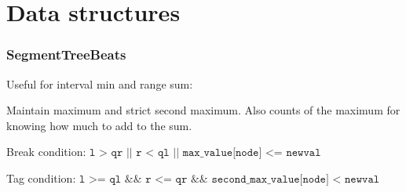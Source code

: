 \chapter{Data structures}

\subsection{SegmentTreeBeats}
Useful for interval min and range sum: 

Maintain maximum and strict second maximum. Also counts of the maximum for knowing how much to add to the sum.

Break condition: $\texttt{l > qr || r < ql || max_value[node] <= newval}$

Tag condition: $\texttt{l >= ql && r <= qr && second_max_value[node] < newval}$

